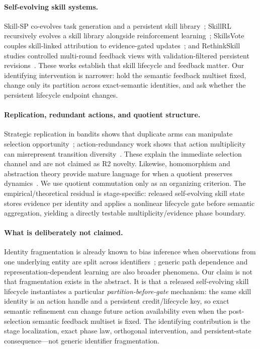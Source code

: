 \paragraph{Self-evolving skill systems.}
Skill-SP co-evolves task generation and a persistent skill library~\citep{huang2026skill}; SkillRL recursively evolves a skill library alongside reinforcement learning~\citep{xia2026skillrl}; SkillsVote couples skill-linked attribution to evidence-gated updates~\citep{liu2026skillsvote}; and RethinkSkill studies controlled multi-round feedback views with validation-filtered persistent revisions~\citep{liu2026rethinkskill}. These works establish that skill lifecycle and feedback matter. Our identifying intervention is narrower: hold the semantic feedback multiset fixed, change only its partition across exact-semantic identities, and ask whether the persistent lifecycle endpoint changes.

\paragraph{Replication, redundant actions, and quotient structure.}
Strategic replication in bandits shows that duplicate arms can manipulate selection opportunity~\citep{shin2022replication}; action-redundancy work shows that action multiplicity can misrepresent transition diversity~\citep{baram2021redundancy}. These explain the immediate selection channel and are not claimed as R2 novelty. Likewise, homomorphism and abstraction theory provide mature language for when a quotient preserves dynamics~\citep{ravindran2004approximate}. We use quotient commutation only as an organizing criterion. The empirical/theoretical residual is stage-specific: released self-evolving skill state stores evidence per identity and applies a nonlinear lifecycle gate before semantic aggregation, yielding a directly testable multiplicity/evidence phase boundary.

\paragraph{What is deliberately not claimed.}
Identity fragmentation is already known to bias inference when observations from one underlying entity are split across identifiers~\citep{lin2022identityfragmentation}; generic path dependence and representation-dependent learning are also broader phenomena. Our claim is not that fragmentation exists in the abstract. It is that a released self-evolving skill lifecycle instantiates a particular \emph{partition-before-gate} mechanism: the same skill identity is an action handle and a persistent credit/lifecycle key, so exact semantic refinement can change future action availability even when the post-selection semantic feedback multiset is fixed. The identifying contribution is the stage localization, exact phase law, orthogonal intervention, and persistent-state consequence---not generic identifier fragmentation.

